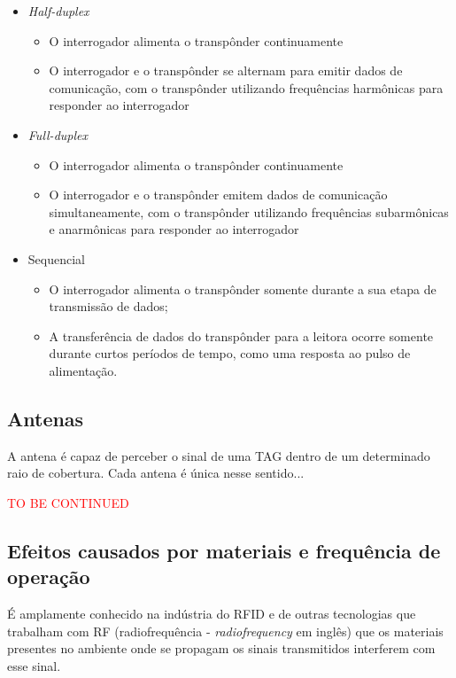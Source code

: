 \begin{itemize}
    \item \textit{Half-duplex}
    \begin{itemize}
        \item O interrogador alimenta o transpônder continuamente
        \item O interrogador e o transpônder se alternam para emitir dados de comunicação, com o transpônder utilizando frequências harmônicas para responder ao interrogador
    \end{itemize}
    \item \textit{Full-duplex}
    \begin{itemize}
        \item O interrogador alimenta o transpônder continuamente
        \item O interrogador e o transpônder emitem dados de comunicação simultaneamente, com o transpônder utilizando frequências subarmônicas e anarmônicas para responder ao interrogador
    \end{itemize}
    \item Sequencial
    \begin{itemize}
        \item O interrogador alimenta o transpônder somente durante a sua etapa de transmissão de dados;
        \item A transferência de dados do transpônder para a leitora ocorre somente durante curtos períodos de tempo, como uma resposta ao pulso de alimentação.
    \end{itemize}
\end{itemize}




\subsection{Antenas}

A antena é capaz de perceber o sinal de uma TAG dentro de um determinado raio de cobertura. Cada antena é única nesse sentido...

\textcolor{red}{TO BE CONTINUED} %


\subsection{Efeitos causados por materiais e frequência de operação}

É amplamente conhecido na indústria do RFID e de outras tecnologias que trabalham com RF (radiofrequência - \textit{radiofrequency} em inglês) que os materiais presentes no ambiente onde se propagam os sinais transmitidos interferem com esse sinal.


